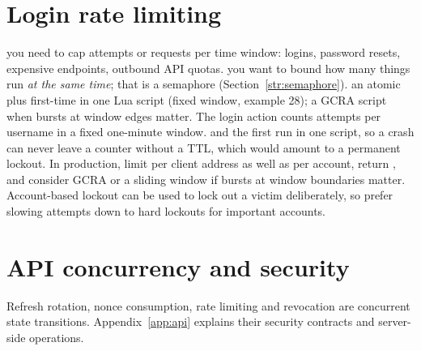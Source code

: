 \section{Login rate limiting}
{you need to cap attempts or requests per time window: logins, password resets, expensive endpoints, outbound API quotas.}
{you want to bound how many things run \emph{at the same time}; that is a semaphore (Section~\ref{str:semaphore}).}
{an atomic  plus first-time  in one Lua script (fixed window, example 28); a GCRA script when bursts at window edges matter.}
The login action counts attempts per username in a fixed one-minute window.  and the first  run in one script, so a crash can never leave a counter without a TTL, which would amount to a permanent lockout. In production, limit per client address as well as per account, return , and consider GCRA or a sliding window if bursts at window boundaries matter. Account-based lockout can be used to lock out a victim deliberately, so prefer slowing attempts down to hard lockouts for important accounts.

\section{API concurrency and security}
Refresh rotation, nonce consumption, rate limiting and revocation are
concurrent state transitions. Appendix~\ref{app:api} explains their
security contracts and server-side operations.

